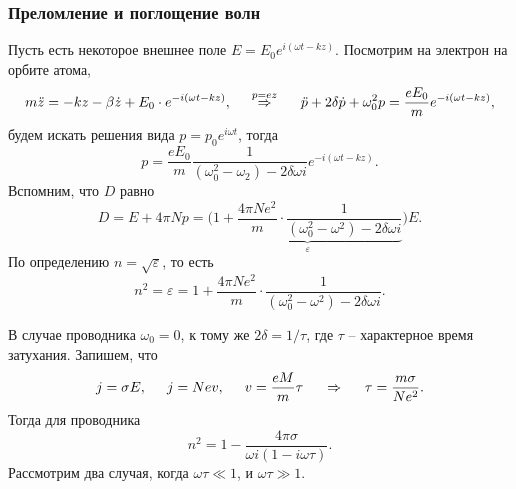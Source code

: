 \subsubsection*{Преломление и поглощение волн}

Пусть есть некоторое внешнее поле $E = E_0 e^{i(\omega t - kz)}$. Посмотрим на электрон на орбите атома,
\begin{equation*}
    m \ddot{z} = - k z - \beta \dot{z} + E_0 \cdot e^{-i(\omega t - kz)},
    \hspace{0.5cm} \overset{p = e z}{\Rightarrow}  \hspace{0.5cm} 
    \ddot{p} + 2 \delta \dot{p} + \omega_0^2 p = \frac{eE_0}{m} e^{-i(\omega t - kz)},
\end{equation*}
будем искать решения вида $p = p_0 e^{i\omega t}$, тогда
\begin{equation*}
    p = \frac{eE_0}{m} \frac{
    1
    }{
    (\omega_0^2 - \omega_2) - 2 \delta \omega i 
    } 
    e^{-i(\omega t - kz)}.
\end{equation*}
Вспомним, что $D$ равно
\begin{equation*}
     D = E + 4 \pi N p = 
     \bigg(
     \underbrace{
     1 + \frac{4\pi N e^2}{m} \cdot 
     \frac{1}{(\omega_0^2 - \omega^2) - 2 \delta \omega i} 
     }_{\varepsilon}
    \bigg) E.
\end{equation*}
По определению $n = \sqrt{\varepsilon}$, то есть
\begin{equation*}
    n^2 = \varepsilon = 1 + \frac{4\pi N e^2}{m} \cdot 
     \frac{1}{(\omega_0^2 - \omega^2) - 2 \delta \omega i}.
\end{equation*}

В случае проводника $\omega_0 = 0$, к тому же $2 \delta = 1 / \tau$, где $\tau$ -- характерное время затухания. Запишем, что
\begin{equation*}
    j = \sigma E, \hspace{0.5cm} j = N e v,
    \hspace{0.5cm} 
    v = \frac{eM}{m} \tau
    \hspace{0.5cm} \Rightarrow \hspace{0.5cm} 
    \tau = \frac{m\sigma}{Ne^2}. 
\end{equation*}
Тогда для проводника
\begin{equation*}
    n^2 = 1 - \frac{4\pi\sigma}{\omega i (1 -i \omega \tau)}.
\end{equation*}
Рассмотрим два случая, когда $\omega \tau \ll 1$, и $\omega \tau \gg 1$. 

